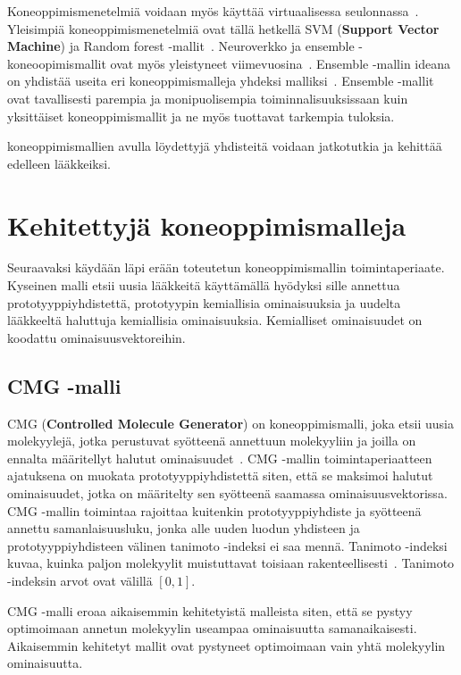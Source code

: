 \documentclass[finnish,twoside,censored,tkt,sw-line]{HYthesisML}
\begin{document}
Koneoppimismenetelmiä voidaan myös käyttää virtuaalisessa seulonnassa~\cite{SotrifferChristoph2011VSPC}.
Yleisimpiä koneoppimismenetelmiä ovat tällä hetkellä SVM (\textbf{Support Vector Machine}) ja Random forest -mallit~\cite{SotrifferChristoph2011VSPC}.
Neuroverkko ja ensemble -koneoopimismallit ovat myös yleistyneet viimevuosina~\cite{ShinBonggun,PopovaMariya2018Drlf}.
Ensemble -mallin ideana on yhdistää useita eri koneoppimismalleja yhdeksi malliksi~\cite{RokachLior2009Ec}.
Ensemble -mallit ovat tavallisesti parempia ja monipuolisempia toiminnalisuuksissaan kuin yksittäiset koneoppimismallit ja ne myös tuottavat tarkempia tuloksia.

koneoppimismallien avulla löydettyjä yhdisteitä voidaan jatkotutkia ja kehittää edelleen lääkkeiksi.

\section{Kehitettyjä koneoppimismalleja}

Seuraavaksi käydään läpi erään toteutetun koneoppimismallin toimintaperiaate.
Kyseinen malli etsii uusia lääkkeitä käyttämällä hyödyksi sille annettua prototyyppiyhdistettä, prototyypin kemiallisia ominaisuuksia ja uudelta lääkkeeltä haluttuja kemiallisia ominaisuuksia.
Kemialliset ominaisuudet on koodattu ominaisuusvektoreihin.

\subsection{CMG -malli}

CMG (\textbf{Controlled Molecule Generator}) on koneoppimismalli, joka etsii uusia molekyylejä, jotka perustuvat syötteenä annettuun molekyyliin ja joilla on ennalta määritellyt halutut ominaisuudet~\cite{ShinBonggun}.
CMG -mallin toimintaperiaatteen ajatuksena on muokata prototyyppiyhdistettä siten, että se maksimoi halutut ominaisuudet, jotka on määritelty sen syötteenä saamassa ominaisuusvektorissa.
CMG -mallin toimintaa rajoittaa kuitenkin prototyyppiyhdiste ja syötteenä annettu samanlaisuusluku, jonka alle uuden luodun yhdisteen ja prototyyppiyhdisteen välinen tanimoto -indeksi ei saa mennä.
Tanimoto -indeksi kuvaa, kuinka paljon molekyylit muistuttavat toisiaan rakenteellisesti~\cite{MaggioraGerald2014Msim}.
Tanimoto -indeksin arvot ovat välillä \([0,1]\).

CMG -malli eroaa aikaisemmin kehitetyistä malleista siten, että se pystyy optimoimaan annetun molekyylin useampaa ominaisuutta samanaikaisesti.
Aikaisemmin kehitetyt mallit ovat pystyneet optimoimaan vain yhtä molekyylin ominaisuutta.
\end{document}

